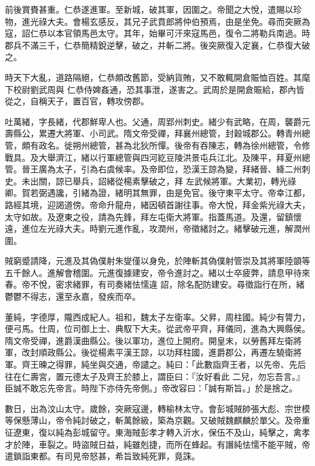 \begin{pinyinscope}
 前後賞賚甚重。仁恭遂進軍。至新城，破其軍，因圍之。帝聞之大悅，遣賜以珍物，進光祿大夫。會楊玄感反，其兄子武賁郎將仲伯預焉，由是坐免。尋而突厥為寇，詔仁恭以本官領馬邑太守。其年，始畢可汗來寇馬邑，復令二將勒兵南過。時郡兵不滿三千，仁恭簡精銳逆擊，破之，并斬二將。後突厥復入定襄，仁恭復大破之。



 時天下大亂，道路隔絕，仁恭頗改舊節，受納貨賄，又不敢輒開倉賑恤百姓。其麾下校尉劉武周與
 仁恭侍婢姦通，恐其事泄，遂害之。武周於是開倉賑給，郡內皆從之，自稱天子，置百官，轉攻傍郡。



 吐萬緒，字長緒，代郡鮮卑人也。父通，周郢州刺史。緒少有武略，在周，襲爵元壽縣公，累遷大將軍、小司武。隋文帝受禪，拜襄州總管，封穀城郡公。轉青州總管，頗有政名。徙朔州總管，甚為北狄所憚。後帝有吞陳志，轉為徐州總管，令修戰具。及大舉濟江，緒以行軍總管與四河紇豆陵洪景屯兵江北。及陳平，拜夏州總管。晉王廣為太子，引為右虞候率。及帝即位，恐漢王諒為變，拜緒晉、絳二州刺史。未出關，諒已舉兵，詔緒從楊素擊破之，拜
 左武候將軍。大業初，轉光祿卿。賀若弼遇讒，引緒為證，緒明其無罪，由是免官。後守東平太守。帝幸江都，路經其境，迎謁道傍。帝命升龍舟，緒因頓首謝往事。帝大悅，拜金紫光祿大夫，太守如故。及遼東之役，請為先鋒，拜左屯衛大將軍。指蓋馬道。及還，留鎮懷遠，進位左光祿大夫。時劉元進作亂，攻潤州，帝徵緒討之。緒擊破元進，解潤州圍。



 賊窮蹙請降，元進及其偽僕射朱燮僅以身免，於陣斬其偽僕射管崇及其將軍陸顗等五千餘人。進解會稽圍。元進復據建安，帝令進討之。緒以士卒疲弊，請息甲待來春。帝不悅，密求緒罪，有司奏緒怯懦違
 詔，除名配防建安。尋徵詣行在所，緒鬱鬱不得志，還至永嘉，發疾而卒。



 董純，字德厚，隴西成紀人。祖和，魏太子左衛率。父昇，周柱國。純少有膂力，便弓馬。仕周，位司御上士、典馭下大夫。從武帝平齊，拜儀同，進為大興縣侯。隋文帝受禪，進爵漢曲縣公。後以軍功，進位上開府。開皇末，以勞舊拜左衛將軍，改封順政縣公。後從楊素平漢王諒，以功拜柱國，進爵郡公，再遷左驍衛將軍。齊王暕之得罪，純坐與交通，帝譴之。純曰：「此數詣齊王者，以先帝、先后往在仁壽宮，置元德太子及齊王於膝上，謂臣曰：『汝好看此
 二兒，勿忘吾言。』臣誠不敢忘先帝言。時陛下亦侍先帝側。」帝改容曰：「誠有斯旨。」於是捨之。



 數日，出為汶山太守。歲餘，突厥寇邊，轉榆林太守。會彭城賊帥張大彪、宗世模等保懸薄山，帝令純討破之，斬萬餘級，築為京觀。又破賊魏麒麟於單父。及帝重征遼東，復以純為彭城留守。東海賊彭孝才轉入沂水，保伍不及山，純擊之，禽孝才於陣，車裂之。時盜賊日益，純雖剋捷，而所在蜂起。有譖純怯懦不能平賊，帝遣鎖詣東都。有司見帝怒甚，希旨致純死罪，竟誅。




\end{pinyinscope}
